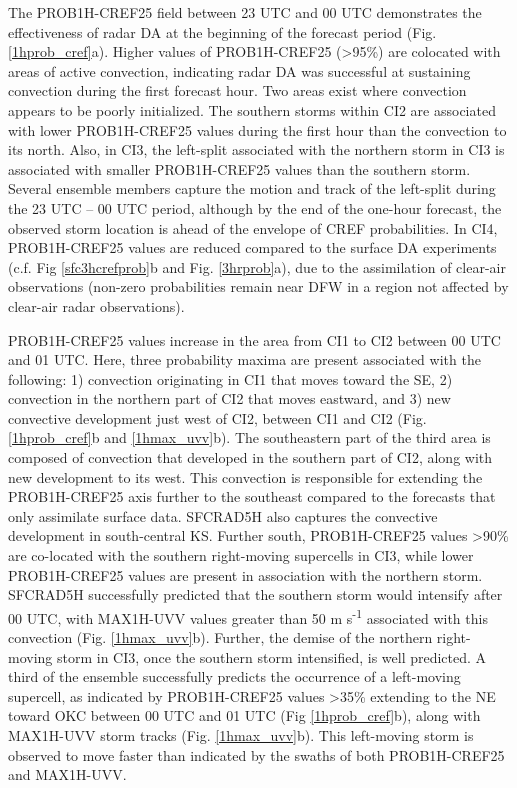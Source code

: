 The PROB1H-CREF25 field between 23 UTC and 00 UTC demonstrates the effectiveness of radar DA at the beginning of the forecast period (Fig. \ref{1hprob_cref}a). Higher values of PROB1H-CREF25 (\textgreater 95\%) are colocated with areas of active convection, indicating radar DA was successful at sustaining convection during the first forecast hour. Two areas exist where convection appears to be poorly initialized. The southern storms within CI2 are associated with lower PROB1H-CREF25 values during the first hour than the convection to its north. Also, in CI3, the left-split associated with the northern storm in CI3 is associated with smaller PROB1H-CREF25 values than the southern storm. Several ensemble members capture the motion and track of the left-split during the 23 UTC -- 00 UTC period, although by the end of the one-hour forecast, the observed storm location is ahead of the envelope of CREF probabilities. In CI4, PROB1H-CREF25 values are reduced compared to the surface DA experiments (c.f. Fig \ref{sfc3hcrefprob}b and Fig. \ref{3hrprob}a), due to the assimilation of clear-air observations (non-zero probabilities remain near DFW in a region not affected by clear-air radar observations).

PROB1H-CREF25 values increase in the area from CI1 to CI2 between 00 UTC and 01 UTC. Here, three probability maxima are present associated with the following: 1) convection originating in CI1 that moves toward the SE, 2) convection in the northern part of CI2 that moves eastward, and 3) new convective development just west of CI2, between CI1 and CI2 (Fig. \ref{1hprob_cref}b and \ref{1hmax_uvv}b). The southeastern part of the third area is composed of convection that developed in the southern part of CI2, along with new development to its west. This convection is responsible for extending the PROB1H-CREF25 axis further to the southeast compared to the forecasts that only assimilate surface data. SFCRAD5H also captures the convective development in south-central KS. Further south, PROB1H-CREF25 values \textgreater 90\% are co-located with the southern right-moving supercells in CI3, while lower PROB1H-CREF25 values are present in association with the northern storm. SFCRAD5H successfully predicted that the southern storm would intensify after 00 UTC, with MAX1H-UVV values greater than 50 m s\textsuperscript{-1} associated with this convection (Fig. \ref{1hmax_uvv}b). Further, the demise of the northern right-moving storm in CI3, once the southern storm intensified, is well predicted. A third of the ensemble successfully predicts the occurrence of a left-moving supercell, as indicated by PROB1H-CREF25 values \textgreater 35\% extending to the NE toward OKC between 00 UTC and 01 UTC (Fig \ref{1hprob_cref}b), along with MAX1H-UVV storm tracks (Fig. \ref{1hmax_uvv}b). This left-moving storm is observed to move faster than indicated by the swaths of both PROB1H-CREF25 and MAX1H-UVV.

